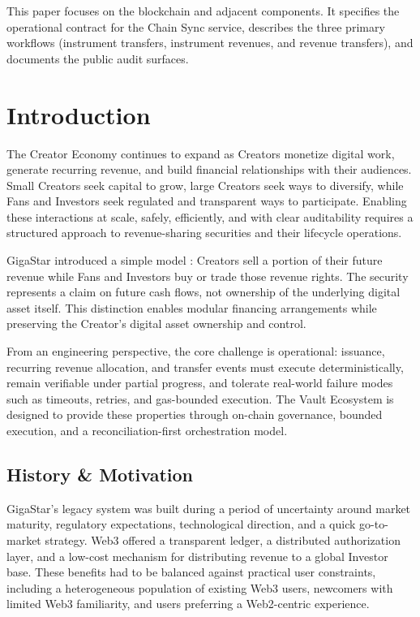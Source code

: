 \documentclass[10pt]{article}
\begin{document}
This paper focuses on the blockchain and adjacent components. It specifies the operational contract for
the Chain Sync service, describes the three primary workflows (instrument transfers, instrument revenues,
and revenue transfers), and documents the public audit surfaces.

\section{Introduction}
The Creator Economy continues to expand as Creators monetize digital work, generate recurring revenue,
and build financial relationships with their audiences. Small Creators seek capital to grow, large Creators
seek ways to diversify, while Fans and Investors seek regulated and transparent ways to participate.
Enabling these interactions at scale, safely, efficiently, and with clear auditability requires a structured
approach to revenue-sharing securities and their lifecycle operations.

GigaStar introduced a simple model \cite{chicago_innovation_awards_2025}: Creators sell a portion of their future revenue while Fans and Investors
buy or trade those revenue rights. The security represents a claim on future cash flows, not ownership of the
underlying digital asset itself. This distinction enables modular financing arrangements while preserving the
Creator's digital asset ownership and control.

From an engineering perspective, the core challenge is operational: issuance, recurring revenue allocation,
and transfer events must execute deterministically, remain verifiable under partial progress, and tolerate
real-world failure modes such as timeouts, retries, and gas-bounded execution. The Vault Ecosystem is
designed to provide these properties through on-chain governance, bounded execution, and a
reconciliation-first orchestration model.

\subsection{History \& Motivation}
GigaStar's legacy system was built during a period of uncertainty around market maturity, regulatory
expectations, technological direction, and a quick go-to-market strategy. Web3 offered a transparent ledger,
a distributed authorization layer, and a low-cost mechanism for distributing revenue to a global Investor base. These benefits had to be balanced against practical user constraints, including a heterogeneous population of existing Web3
users, newcomers with limited Web3 familiarity, and users preferring a Web2-centric experience.
\end{document}
